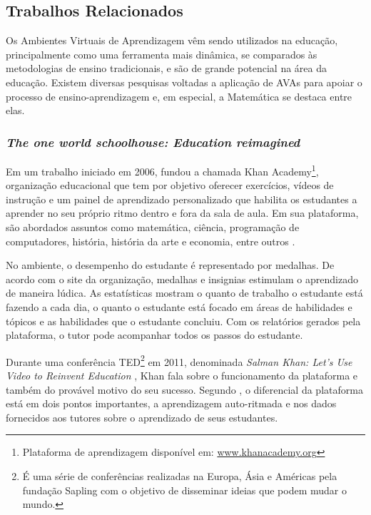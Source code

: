 \subsection{Trabalhos Relacionados}\label{trabalhos_relacionados}

Os Ambientes Virtuais de Aprendizagem vêm sendo utilizados na educação, principalmente como uma ferramenta mais dinâmica, se comparados \`as metodologias de ensino tradicionais, e são de 
grande potencial na área da educação. Existem diversas pesquisas voltadas a aplicação de AVAs para apoiar o processo de ensino-aprendizagem e, em especial, a Matemática se destaca entre elas.

\subsubsection{\textit{The one world schoolhouse: Education reimagined}}
Em um trabalho iniciado em 2006,  fundou a chamada Khan Academy\footnote{Plataforma de aprendizagem disponível em: \url{www.khanacademy.org}}, organização educacional que tem 
por objetivo oferecer exercícios, vídeos de instrução e um painel de aprendizado personalizado que habilita os estudantes a aprender no seu próprio ritmo dentro e fora da sala de aula. Em sua 
plataforma, são abordados assuntos como matemática, ciência, programação de computadores, história, história da arte e economia, entre outros \cite{khan2012one}.

No ambiente, o desempenho do estudante é representado por medalhas. De acordo com o site da organização, medalhas e insignias estimulam o aprendizado de maneira lúdica. As estatísticas mostram o 
quanto de trabalho o estudante está fazendo a cada dia, o quanto o estudante está focado em áreas de habilidades e tópicos e as habilidades que o estudante concluiu. Com os relatórios gerados pela 
plataforma, o tutor pode acompanhar todos os passos do estudante.

Durante uma conferência TED\footnote{É uma série de conferências realizadas na Europa, Ásia e Américas pela fundação Sapling com o objetivo de disseminar ideias que podem mudar o mundo.} em 2011, 
denominada \textit{Salman Khan: Let's Use Video to Reinvent Education} \cite{tedtalk2011reinvend}, Khan fala sobre o funcionamento da plataforma e também do provável motivo do seu sucesso. Segundo 
, o diferencial da plataforma está em dois pontos importantes, a aprendizagem auto-ritmada e nos dados fornecidos aos tutores sobre o aprendizado de seus estudantes. 

